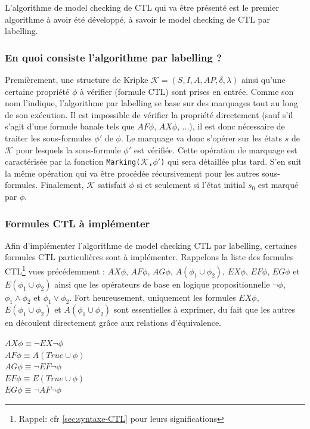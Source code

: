 \documentclass[runningheads,a4paper,10pt]{llncs}
\begin{document}
L'algorithme de model checking de CTL qui va être présenté est le premier algorithme à avoir été développé, à savoir le model checking de CTL par labelling. 

\subsubsection{En quoi consiste l'algorithme par labelling ?} 

Premièrement, une structure de Kripke $\mathcal{K} = (S,I,A,AP,\delta,\lambda)$ ainsi qu'une certaine propriété $\phi$ à vérifier (formule CTL) sont prises en entrée. Comme son nom l'indique, l'algorithme par labelling se base sur des marquages tout au long de son exécution. Il est impossible de vérifier la propriété directement (sauf s'il s'agit d'une formule banale tels que $AF\phi$, $AX\phi$, ...), il est donc nécessaire de traiter les sous-formules $\phi '$ de $\phi$. Le marquage va donc s'opérer sur les états $s$ de $\mathcal{K}$ pour lesquels la sous-formule $\phi '$ est vérifiée. Cette opération de marquage est caractérisée par la fonction  \texttt{Marking($\mathcal{K}$,$\phi '$)} qui sera détaillée plus tard. S'en suit la même opération qui va être procédée récursivement pour les autres sous-formules. Finalement, $\mathcal{K}$ satisfait $\phi$ si et seulement si l'état initial $s_{0}$ est marqué par $\phi$.  

\subsubsection{Formules CTL à implémenter} 
Afin d'implémenter l'algorithme de model checking CTL par labelling, certaines formules CTL particulières sont à implémenter. Rappelons la liste des formules CTL\footnote{Rappel: cfr \autoref{sec:syntaxe-CTL} pour leurs significations} vues précédemment : 
$AX\phi$, $AF\phi$, $AG\phi$, $A(\phi_{1} \cup \phi_{2})$, $EX\phi$, $EF\phi$, $EG\phi$ et $E(\phi_{1} \cup \phi_{2})$ ainsi que les opérateurs de base en logique propositionnelle $\neg \phi$, $\phi_{1} \wedge \phi_{2}$ et $\phi_{1} \vee \phi_{2}$. Fort heureusement, uniquement les formules $EX\phi$, $E(\phi_{1} \cup \phi_{2})$ et $A(\phi_{1} \cup \phi_{2})$ sont essentielles à exprimer, du fait que les autres en découlent directement grâce aux relations d'équivalence.


\begin{center}
$ AX\phi \equiv \neg EX \neg \phi $ \\
$ AF\phi \equiv A(True \cup \phi) $ \\
$ AG\phi \equiv \neg EF \neg \phi $ \\
$ EF\phi \equiv E(True \cup \phi) $ \\
$ EG\phi \equiv \neg AF \neg \phi$ \\
\end{center}
\end{document}
